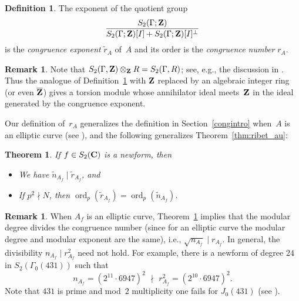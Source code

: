 \documentclass[10pt,twoside]{article}
\newcommand{\Z}{{\bf{Z}}}
\newcommand{\Zbar}{{\overline{\Z}}}
\newcommand{\C}{{\bf{C}}}
\newcommand{\tensor}{\otimes}
\newcommand{\rA}{{r_{\scriptscriptstyle{A}}}}
\newcommand{\rAe}{{\tilde{r}_{\scriptscriptstyle{A}}}}
\newcommand{\rAfe}{{\tilde{r}_{\scriptscriptstyle{A_f}}}}
\newcommand{\rAf}{{r_{\scriptscriptstyle{A_f}}}}
\newcommand{\nAfe}{{\tilde{n}_{\scriptscriptstyle{A_f}}}}
\newcommand{\nAf}{n_{\scriptscriptstyle{A_f}}}
\newtheorem{thm}[lem]{Theorem}
\theoremstyle{definition}
\newtheorem{defi}[lem]{Definition}
\newtheorem{rmk}[lem]{Remark}
\DeclareMathOperator{\ord}{ord}
\begin{document}
\begin{defi}\label{def:congexp}
The exponent of the quotient group
\begin{equation}\label{eqn:congexp}
   \frac{S_2(\Gamma; \Z)} { S_2(\Gamma; \Z)[I] + S_2(\Gamma;\Z)[I]^{\perp}}
\end{equation}
is the {\em congruence exponent} $\rAe$ of~$A$ and its
order is the {\em congruence number} $\rA$.
\end{defi}

\begin{rmk}
  Note that $S_2(\Gamma,\Z)\tensor_\Z R = S_2(\Gamma,R)$; see, e.g.,
  the discussion in \cite[\S12]{diamond-im}.  Thus the analogue of
  Definition~\ref{def:congexp} with $\Z$ replaced by an algebraic
  integer ring (or even $\Zbar$) gives a torsion module whose
  annihilator ideal meets~$\Z$ in the ideal generated by the
  congruence exponent.
\end{rmk}

Our definition of~$\rA$ generalizes the definition in
Section~\ref{congintro} when~$A$ is an elliptic curve (see
\cite[p.~276]{abbull}), and the following generalizes 
Theorem~\ref{thm:ribet_au}:
\begin{thm}\label{thm:ribet_gen}
If $f \in S_2(\C)$ is a newform, then
\begin{itemize}
\item[(a)] We have $\nAfe \mid \rAfe$, and
\item[(b)] If $p^2 \nmid N$, then $\ord_p(\rAfe) = \ord_p(\nAfe)$.
\end{itemize}
\end{thm}

\begin{rmk}\label{rem:24}
  When $A_f$ is an elliptic curve, Theorem~\ref{thm:ribet_gen} implies
  that the modular degree divides the congruence number (since for an
  elliptic curve the modular degree and modular exponent are the
  same), i.e., $\sqrt{\nAf} \mid \rAf$.  In general, the divisibility
  $\nAf\mid r^2_{A_f}$ need not hold.  For example, there is a newform
  of degree $24$ in $S_2(\Gamma_0(431))$ such that
 $$\nAf = (2^{11}\cdot 6947)^2 \,\,\nmid\,\, r^2_{A_f} = (2^{10}\cdot
  6947)^2.$$  
Note that $431$ is prime and mod~$2$ multiplicity one fails for $J_0(431)$ (see
  \cite{kilford}). 
\end{rmk}
\end{document}
